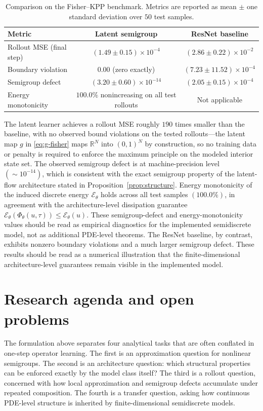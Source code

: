 \documentclass[11pt]{article}
\newcommand{\cE}{\mathcal{E}}
\begin{document}
\begin{table}[htbp]
\centering
\caption{Comparison on the Fisher--KPP benchmark. Metrics are reported as mean $\pm$ one standard deviation over $50$ test samples.}
\label{tab:benchmark-results}
\begin{tabular}{lcc}
\hline
Metric & Latent semigroup & ResNet baseline \\
\hline
Rollout MSE (final step) & $(1.49\pm 0.15)\times10^{-4}$ & $(2.86\pm 0.22)\times10^{-2}$ \\[2pt]
Boundary violation & $0.00$ (zero exactly) & $(7.23\pm 11.52)\times10^{-4}$ \\[2pt]
Semigroup defect & $(3.20\pm 0.60)\times10^{-14}$ & $(2.05\pm 0.15)\times10^{-4}$ \\[2pt]
Energy monotonicity & $100.0\%$ nonincreasing on all test rollouts & Not applicable \\
\hline
\end{tabular}
\end{table}

The latent learner achieves a rollout MSE roughly \(190\) times smaller than the baseline, with no observed bound violations on the tested rollouts---the latent map \(g\) in \eqref{eq:g-fisher} maps \(\mathbb{R}^N\) into \((0,1)^N\) by construction, so no training data or penalty is required to enforce the maximum principle on the modeled interior state set. The observed semigroup defect is at machine-precision level \((\sim10^{-14})\), which is consistent with the exact semigroup property of the latent-flow architecture stated in Proposition~\ref{prop:structure}. Energy monotonicity of the induced discrete energy \(\cE_{\theta}\) holds across all test samples \((100.0\%)\), in agreement with the architecture-level dissipation guarantee \(\cE_\theta(\Phi_\theta(u,\tau))\le\cE_\theta(u)\). These semigroup-defect and energy-monotonicity values should be read as empirical diagnostics for the implemented semidiscrete model, not as additional PDE-level theorems. The ResNet baseline, by contrast, exhibits nonzero boundary violations and a much larger semigroup defect. These results should be read as a numerical illustration that the finite-dimensional architecture-level guarantees remain visible in the implemented model.

\section{Research agenda and open problems}\label{sec:analytical-questions}
The formulation above separates four analytical tasks that are often conflated in one-step operator learning. The first is an approximation question for nonlinear semigroups. The second is an architecture question: which structural properties can be enforced exactly by the model class itself? The third is a rollout question, concerned with how local approximation and semigroup defects accumulate under repeated composition. The fourth is a transfer question, asking how continuous PDE-level structure is inherited by finite-dimensional semidiscrete models.
\end{document}
